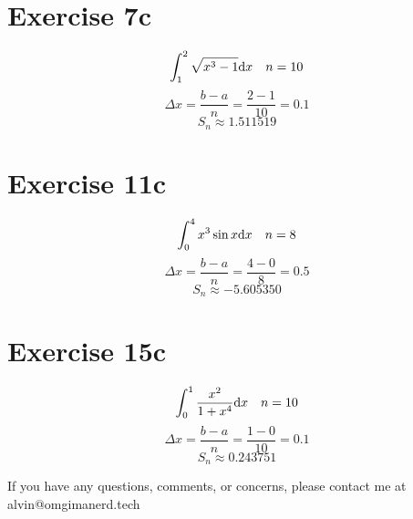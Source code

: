 \documentclass[letterpaper, 12pt]{math}
\begin{document}
\section*{Exercise 7c}
\[ \int_{1}^{2}{\sqrt{x^{3}-1}\mathrm{d}{x}} \quad n = 10 \]
\[ \Delta x = \frac{b-a}{n} = \frac{2-1}{10} = 0.1 \]
\[ S_{n} \approx 1.511519 \]

\section*{Exercise 11c}
\[ \int_{0}^{4}{x^{3}\sin{x}\mathrm{d}{x}} \quad n = 8 \]
\[ \Delta x = \frac{b-a}{n} = \frac{4-0}{8} = 0.5 \]
\[ S_{n} \approx -5.605350 \]

\section*{Exercise 15c}
\[ \int_{0}^{1}{\frac{x^{2}}{1+x^{4}}\mathrm{d}{x}} \quad n = 10 \]
\[ \Delta x = \frac{b-a}{n} = \frac{1-0}{10} = 0.1 \]
\[ S_{n} \approx 0.243751 \]

\begin{center}
  If you have any questions, comments, or concerns, please contact me at
  alvin@omgimanerd.tech
\end{center}
\end{document}
